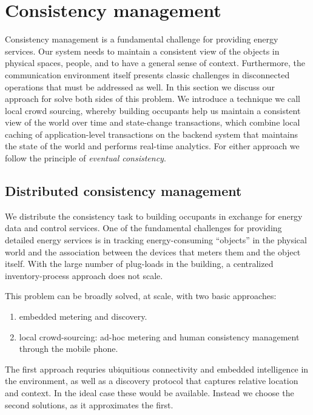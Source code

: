 \section{Consistency management}
Consistency management is a fundamental challenge for providing energy services.  Our system needs to maintain a consistent view
of the objects in physical spaces, people, and to have a general sense of context.  Furthermore, the communication environment
itself presents classic challenges in disconnected operations that must be addressed as well.  In this section
we discuss our approach for solve both sides of this problem.  We introduce a technique we call local crowd sourcing, whereby
building occupants help us maintain a consistent view of the world over time and state-change transactions, which combine
local caching of application-level transactions on the backend system that maintains the state of the world and performs
real-time analytics.  For either approach we follow the principle of \emph{eventual consistency}.

\subsection{Distributed consistency management}
We distribute the consistency task to building occupants in exchange for energy data and control services.  One of the fundamental challenges
for providing detailed energy services is in tracking energy-consuming ``objects'' in the physical world and the association
between the devices that meters them and the object itself.  With the large number of plug-loads in the building, a centralized 
inventory-process approach does not scale.

This problem can be broadly solved, at scale, with two basic approaches:

\begin{enumerate}
\item embedded metering and discovery.
\item local crowd-sourcing: ad-hoc metering and human consistency management through the mobile phone.
\end{enumerate}

The first approach requries ubiquitious connectivity and embedded intelligence in the environment, as well as a discovery protocol
that captures relative location and context.  In the ideal case these would be available.  Instead we choose the second solutions, as it
approximates the first.

